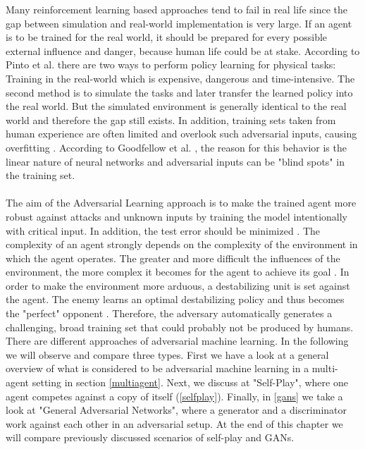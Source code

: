 Many reinforcement learning based approaches tend to fail in real life since the gap between simulation and real-world implementation is very large. If an agent is to be trained for the real world, it should be prepared for every possible external influence and danger, because human life could be at stake. According to Pinto et al. \cite{robustPinto2017Mar} there are two ways to perform policy learning for physical tasks: Training in the real-world which is expensive, dangerous and time-intensive. The second method is to simulate the tasks and later transfer the learned policy into the real world. But the simulated environment is generally identical to the real world and therefore the gap still exists. In addition, training sets taken from human experience are often limited and overlook such adversarial inputs, causing overfitting \cite{robustPinto2017Mar}. According to Goodfellow et al. \cite{harnessing_goodfellow}, the reason for this behavior is the linear nature of neural networks and adversarial inputs can be "blind spots" in the training set.\\
\\
The aim of the Adversarial Learning approach is to make the trained agent more robust against attacks and unknown inputs by training the model intentionally with critical input. In addition, the test error should be minimized \cite{MachineLearningAtScale}.
The complexity of an agent strongly depends on the complexity of the environment in which the agent operates. The greater and more difficult the influences of the environment, the more complex it becomes for the agent to achieve its goal \cite{environmentBansal2017Oct}.
In order to make the environment more arduous, a destabilizing unit is set against the agent. The enemy learns an optimal destabilizing policy and thus becomes the "perfect" opponent \cite{robustPinto2017Mar}. Therefore, the adversary automatically generates a challenging, broad training set that could probably not be produced by humans.
There are different approaches of adversarial machine learning. In the following we will observe and compare three types. First we have a look at a general overview of what is considered to be adversarial machine learning in a multi-agent setting in section \ref{multiagent}. Next, we discuss at "Self-Play", where one agent competes against a copy of itself (\ref{selfplay}). Finally, in \ref{gans} we take a look at "General Adversarial Networks", where a generator and a discriminator work against each other in an adversarial setup.
At the end of this chapter we will compare previously discussed scenarios of  self-play and GANs. 
